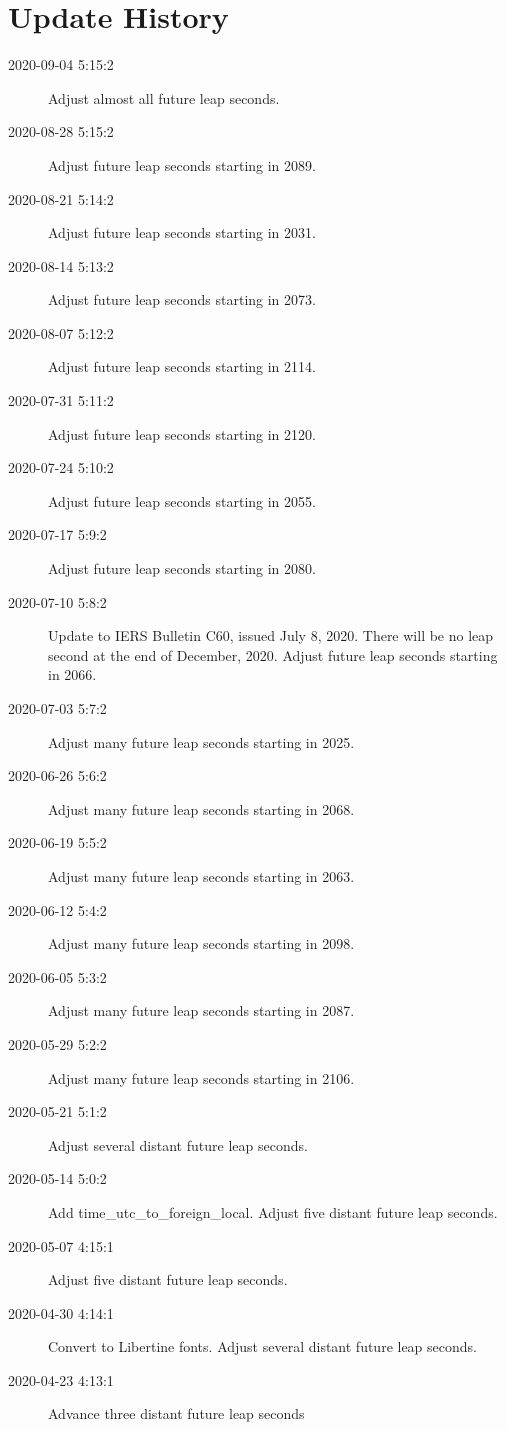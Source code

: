 \documentclass[letterpaper,twoside]{article}
\begin{document}
\section{Update History}

\begin{description}
  \item[2020-09-04 5:15:2]Adjust almost all future leap seconds.
\item[2020-08-28 5:15:2]Adjust future leap seconds starting in 2089.
\item[2020-08-21 5:14:2]Adjust future leap seconds starting in 2031.
\item[2020-08-14 5:13:2]Adjust future leap seconds starting in 2073.
\item[2020-08-07 5:12:2]Adjust future leap seconds starting in 2114.
\item[2020-07-31 5:11:2]Adjust future leap seconds starting in 2120.
\item[2020-07-24 5:10:2]Adjust future leap seconds starting in 2055.
\item[2020-07-17 5:9:2]Adjust future leap seconds starting in 2080.
\item[2020-07-10 5:8:2]Update to IERS Bulletin C60, issued
  July 8, 2020.  There will be no leap second at the end of
  December, 2020.  Adjust future leap seconds starting in 2066.
\item[2020-07-03 5:7:2]Adjust many future leap seconds starting in 2025.
\item[2020-06-26 5:6:2]Adjust many future leap seconds starting in 2068.
\item[2020-06-19 5:5:2]Adjust many future leap seconds starting in 2063.
\item[2020-06-12 5:4:2]Adjust many future leap seconds starting in 2098.
\item[2020-06-05 5:3:2]Adjust many future leap seconds starting in 2087.
\item[2020-05-29 5:2:2]Adjust many future leap seconds starting in 2106.
\item[2020-05-21 5:1:2]Adjust several distant future leap seconds.
\item[2020-05-14 5:0:2]Add time\_utc\_to\_foreign\_local.
  Adjust five distant future leap seconds.
\item[2020-05-07 4:15:1]Adjust five distant future leap seconds.
\item[2020-04-30 4:14:1]Convert to Libertine fonts.  Adjust several distant
  future leap seconds.
\item[2020-04-23 4:13:1]Advance three distant future leap seconds

\end{description}
\end{document}
